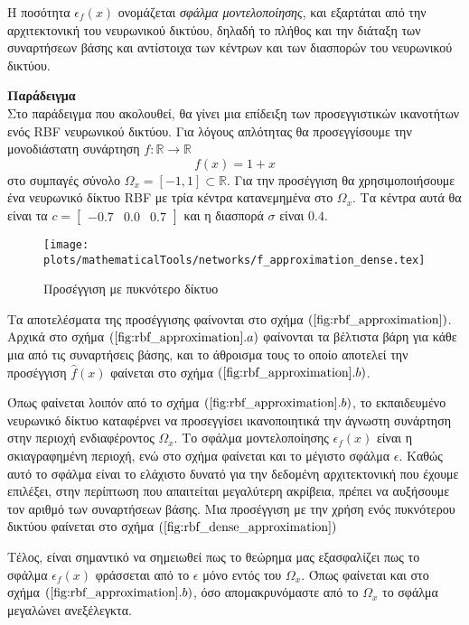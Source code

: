 Η ποσότητα $\epsilon_f(x)$ ονομάζεται \textit{σφάλμα μοντελοποίησης}, και εξαρτάται από την αρχιτεκτονική του νευρωνικού δικτύου, δηλαδή το πλήθος και την διάταξη των συναρτήσεων βάσης και αντίστοιχα των κέντρων και των διασπορών του νευρωνικού δικτύου.

\textbf{Παράδειγμα}\\
Στο παράδειγμα που ακολουθεί, θα γίνει μια επίδειξη των προσεγγιστικών ικανοτήτων ενός RBF νευρωνικού δικτύου. Για λόγους απλότητας θα προσεγγίσουμε την μονοδιάστατη συνάρτηση $f: \mathbb{R} \rightarrow \mathbb{R} $
\begin{equation*}
f(x) = 1+x
\end{equation*}
στο συμπαγές σύνολο $\Omega_x = [-1,1] \subset \mathbb{R}$. Για την προσέγγιση θα χρησιμοποιήσουμε ένα νευρωνικό δίκτυο RBF με τρία κέντρα κατανεμημένα στο $\Omega_x$. Τα κέντρα αυτά θα είναι τα $c = \begin{bmatrix} -0.7 & 0.0 & 0.7 \end{bmatrix}$ και η διασπορά $\sigma$ είναι $0.4$. 

{
\begin{wrapfigure}{r}{0.4\textwidth}
	\centering
	\texttt{[image: plots/mathematicalTools/networks/f\_approximation\_dense.tex]}
	\caption{Προσέγγιση με πυκνότερο δίκτυο}
	\label{fig:rbf_dense_approximation}	
\end{wrapfigure}

Τα αποτελέσματα της προσέγγισης φαίνονται στο σχήμα $(\ref{fig:rbf_approximation})$. Αρχικά στο σχήμα $(\ref{fig:rbf_approximation}.a)$ φαίνονται τα βέλτιστα βάρη για κάθε μια από τις συναρτήσεις βάσης, και το άθροισμα τους το οποίο αποτελεί την προσέγγιση $\hat{f}(x)$ φαίνεται στο σχήμα $(\ref{fig:rbf_approximation}.b)$. 

Όπως φαίνεται λοιπόν από το σχήμα $(\ref{fig:rbf_approximation}.b)$, το εκπαιδευμένο νευρωνικό δίκτυο καταφέρνει να προσεγγίσει ικανοποιητικά την άγνωστη συνάρτηση στην περιοχή ενδιαφέροντος $\Omega_x$. Το σφάλμα μοντελοποίησης $\epsilon_f(x)$ είναι η σκιαγραφημένη περιοχή, ενώ στο σχήμα φαίνεται και το μέγιστο σφάλμα $\epsilon$. Καθώς αυτό το σφάλμα είναι το ελάχιστο δυνατό για την δεδομένη αρχιτεκτονική που έχουμε επιλέξει, στην περίπτωση που απαιτείται μεγαλύτερη ακρίβεια, πρέπει να αυξήσουμε τον αριθμό των συναρτήσεων βάσης. Μια προσέγγιση με την χρήση ενός πυκνότερου δικτύου φαίνεται στο σχήμα $(\ref{fig:rbf_dense_approximation})$

}

Τέλος, είναι σημαντικό να σημειωθεί πως το θεώρημα μας εξασφαλίζει πως το σφάλμα $\epsilon_f(x)$ φράσσεται από το $\epsilon$ μόνο εντός του $\Omega_x$. Όπως φαίνεται και στο σχήμα $(\ref{fig:rbf_approximation}.b)$, όσο απομακρυνόμαστε από το $\Omega_x$ το σφάλμα μεγαλώνει ανεξέλεγκτα.



